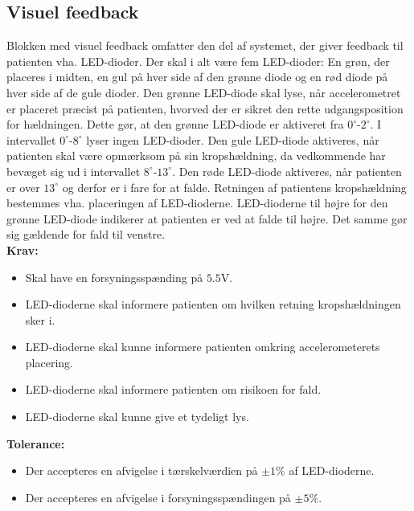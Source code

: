 \subsection{Visuel feedback}
Blokken med visuel feedback omfatter den del af systemet, der giver feedback til patienten vha. LED-dioder. Der skal i alt være fem LED-dioder: En grøn, der placeres i midten, en gul på hver side af den grønne diode og en rød diode på hver side af de gule dioder. Den grønne LED-diode skal lyse, når accelerometret er placeret præcist på patienten, hvorved der er sikret den rette udgangsposition for hældningen. Dette gør, at den grønne LED-diode er aktiveret fra $0^{\circ}$-$2^{\circ}$. I intervallet $0^{\circ}$-$8^{\circ}$ lyser ingen LED-dioder. Den gule LED-diode aktiveres, når patienten skal være opmærksom på sin kropshældning, da vedkommende har bevæget sig ud i intervallet $8^{\circ}$-$13^{\circ}$. Den røde LED-diode aktiveres, når patienten er over $13^{\circ}$ og derfor er i fare for at falde. Retningen af patientens kropshældning bestemmes vha. placeringen af LED-dioderne. LED-dioderne til højre for den grønne LED-diode indikerer at patienten er ved at falde til højre. Det samme gør sig gældende for fald til venstre. 
\\
\textbf{Krav:}
\begin{itemize}
	\item Skal have en forsyningsspænding på  $5.5$V.
	\item LED-dioderne skal informere patienten om hvilken retning kropshældningen sker i.
	\item LED-dioderne skal kunne informere patienten omkring accelerometerets placering.
	\item LED-dioderne skal informere patienten om risikoen for fald.
	\item LED-dioderne skal kunne give et tydeligt lys.
\end{itemize}
\textbf{Tolerance:}
\begin{itemize}
	\item Der accepteres en afvigelse i tærskelværdien på $\pm1\%$ af LED-dioderne.
	\item Der accepteres en afvigelse i forsyningsspændingen på $\pm5\%$.
\end{itemize}

